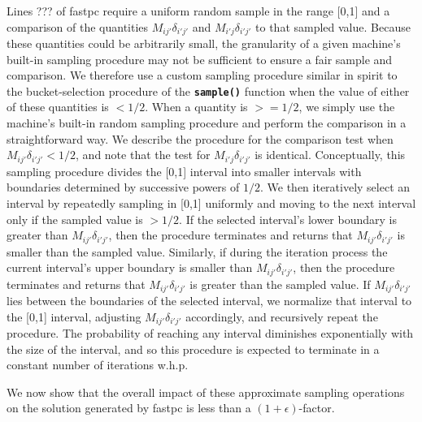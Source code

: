 \documentclass[11pt]{article}
\newcommand{\incVal}{\delta_{i'j'}}
\newcommand{\func}[1]{{\bf\texttt{#1}}}
\newcommand{\epsUp}{(1+\epsilon)}
\begin{document}
Lines ??? of fastpc require a uniform random sample in the range [0,1] and a comparison of the quantities $M_{ij'}\incVal$ and $M_{i'j}\incVal$ to that sampled value.
Because these quantities could be arbitrarily small, the granularity of a given machine's built-in sampling procedure may not be sufficient to ensure a fair sample and comparison.  
We therefore use a custom sampling procedure similar in spirit to the bucket-selection procedure of the \func{sample()} function when the value of either of these quantities is $< 1/2$.  When a quantity is $>= 1/2$, we simply use the machine's built-in random sampling procedure and perform the comparison in a straightforward way.
We describe the procedure for the comparison test when $M_{ij'}\incVal < 1/2$, and note that the test for $M_{i'j}\incVal$ is identical.
Conceptually, this sampling procedure divides the [0,1] interval into smaller intervals with boundaries determined by successive powers of $1/2$.  
We then iteratively select an interval by repeatedly sampling in [0,1] uniformly and moving to the next interval only if the sampled value is $> 1/2$.  
If the selected interval's lower boundary is greater than $M_{ij'}\incVal$, then the procedure terminates and returns that $M_{ij'}\incVal$ is smaller than the sampled value. 
Similarly, if during the iteration process the current interval's upper boundary is smaller than $M_{ij'}\incVal$, then the procedure terminates and returns that $M_{ij'}\incVal$ is greater than the sampled value.  
If $M_{ij'}\incVal$ lies between the boundaries of the selected interval, we normalize that interval to the [0,1] interval, adjusting $M_{ij'}\incVal$ accordingly, and recursively repeat the procedure.
The probability of reaching any interval diminishes exponentially with the size of the interval, and so this procedure is expected to terminate in a constant number of iterations w.h.p.

We now show that the overall impact of these approximate sampling operations on the solution generated by fastpc is less than a $\epsUp$-factor.  

   
\end{document}

